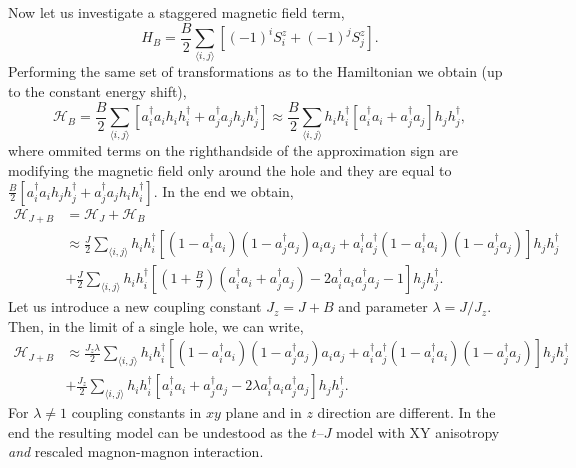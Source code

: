 \documentclass[%
 reprint,
 amsmath,amssymb,
 aps, onecolumn,
prl,
]{revtex4-1}
\newcommand{\mean}[1]{\langle#1\rangle}
\begin{document}
Now let us investigate a staggered magnetic field term,
\begin{equation}
	H_{B} = \frac{B}{2} \sum_{\mean{i,j}} \left[(-1)^i S^z_i + (-1)^j S^z_j\right].
\end{equation}
Performing the same set of transformations as to the Hamiltonian we obtain (up to the constant energy shift),
\begin{equation}
	\mathcal{H}_{B} = \frac{B}{2} \sum_{\mean{i,j}} 
	\left[a_i^\dag a_i h_i h_i^\dag + a_j^\dag a_j h_j h_j^\dag \right] \approx \frac{B}{2} \sum_{\mean{i,j}} 
	h_i h_i^\dag \left[a_i^\dag a_i + a_j^\dag a_j \right] h_j h_j^\dag,
\end{equation}
where ommited terms on the righthandside of the approximation sign are modifying the magnetic field only around the hole and they are equal to $\frac{B}{2} \left[ a_i^\dag a_i h_j h_j^\dag + a_j^\dag a_j h_i h_i^\dag \right]$. In the end we obtain,
\begin{equation}
	\begin{aligned}
	\mathcal{H}_{J+B} &= \mathcal{H}_{J} + \mathcal{H}_{B} \\
	&\approx \frac{J}{2}\sum_{\mean{i,j}} h_i h_i^\dag \left[(1 - a_i^\dag a_i)(1 - a_j^\dag a_j)a_i a_j + a_i^\dag a_j^\dag (1 - a_i^\dag a_i)(1 - a_j^\dag a_j) \right] h_j h_j^\dag \\
	&+ \frac{J}{2} \sum_{\mean{i,j}} h_i h_i^\dag \left[\left(1+\frac{B}{J}\right)\left(a_i^\dag a_i + a_j^\dag a_j\right) - 2 a_i^\dag a_i a_j^\dag a_j - 1\right] h_j h_j^\dag.
	\end{aligned}
\end{equation}
Let us introduce a new coupling constant $J_z = J + B$ and parameter $\lambda = J / J_z$. Then, in the limit of a single hole, we can write,
\begin{equation}
	\begin{aligned}
	\mathcal{H}_{J+B} 
	&\approx \frac{J_z \lambda}{2}\sum_{\mean{i,j}} h_i h_i^\dag \left[(1 - a_i^\dag a_i)(1 - a_j^\dag a_j)a_i a_j + a_i^\dag a_j^\dag (1 - a_i^\dag a_i)(1 - a_j^\dag a_j) \right] h_j h_j^\dag  \\
	&+ \frac{J_z}{2} \sum_{\mean{i,j}} h_i h_i^\dag \left[a_i^\dag a_i + a_j^\dag a_j - 2\lambda a_i^\dag a_i a_j^\dag a_j \right] h_j h_j^\dag.
	\end{aligned}
\end{equation}
For $\lambda \neq 1$ coupling constants in $xy$ plane and in $z$ direction are different. In the end the resulting model can be undestood as the $t$--$J$ model with XY anisotropy {\it and} rescaled magnon-magnon interaction.
\end{document}
